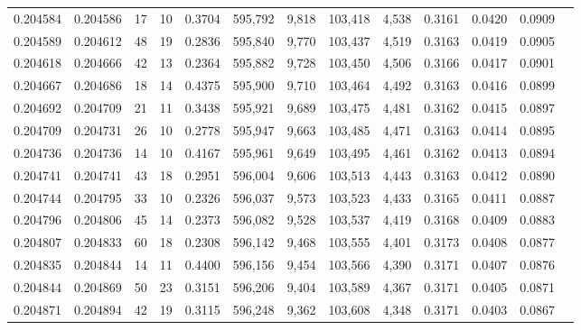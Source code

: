 \begin{tabular}{rrrrrrrrrrrrr}
0.204584 & 0.204586 &    17 &  10 &                                     0.3704 & 595,792 &   9,818 & 103,418 &   4,538 & 0.3161 & 0.0420 & 0.0909 \\
0.204589 & 0.204612 &    48 &  19 &                                     0.2836 & 595,840 &   9,770 & 103,437 &   4,519 & 0.3163 & 0.0419 & 0.0905 \\
0.204618 & 0.204666 &    42 &  13 &                                     0.2364 & 595,882 &   9,728 & 103,450 &   4,506 & 0.3166 & 0.0417 & 0.0901 \\
0.204667 & 0.204686 &    18 &  14 &                                     0.4375 & 595,900 &   9,710 & 103,464 &   4,492 & 0.3163 & 0.0416 & 0.0899 \\
0.204692 & 0.204709 &    21 &  11 &                                     0.3438 & 595,921 &   9,689 & 103,475 &   4,481 & 0.3162 & 0.0415 & 0.0897 \\
0.204709 & 0.204731 &    26 &  10 &                                     0.2778 & 595,947 &   9,663 & 103,485 &   4,471 & 0.3163 & 0.0414 & 0.0895 \\
0.204736 & 0.204736 &    14 &  10 &                                     0.4167 & 595,961 &   9,649 & 103,495 &   4,461 & 0.3162 & 0.0413 & 0.0894 \\
0.204741 & 0.204741 &    43 &  18 &                                     0.2951 & 596,004 &   9,606 & 103,513 &   4,443 & 0.3163 & 0.0412 & 0.0890 \\
0.204744 & 0.204795 &    33 &  10 &                                     0.2326 & 596,037 &   9,573 & 103,523 &   4,433 & 0.3165 & 0.0411 & 0.0887 \\
0.204796 & 0.204806 &    45 &  14 &                                     0.2373 & 596,082 &   9,528 & 103,537 &   4,419 & 0.3168 & 0.0409 & 0.0883 \\
0.204807 & 0.204833 &    60 &  18 &                                     0.2308 & 596,142 &   9,468 & 103,555 &   4,401 & 0.3173 & 0.0408 & 0.0877 \\
0.204835 & 0.204844 &    14 &  11 &                                     0.4400 & 596,156 &   9,454 & 103,566 &   4,390 & 0.3171 & 0.0407 & 0.0876 \\
0.204844 & 0.204869 &    50 &  23 &                                     0.3151 & 596,206 &   9,404 & 103,589 &   4,367 & 0.3171 & 0.0405 & 0.0871 \\
0.204871 & 0.204894 &    42 &  19 &                                     0.3115 & 596,248 &   9,362 & 103,608 &   4,348 & 0.3171 & 0.0403 & 0.0867 \\

\end{tabular}
